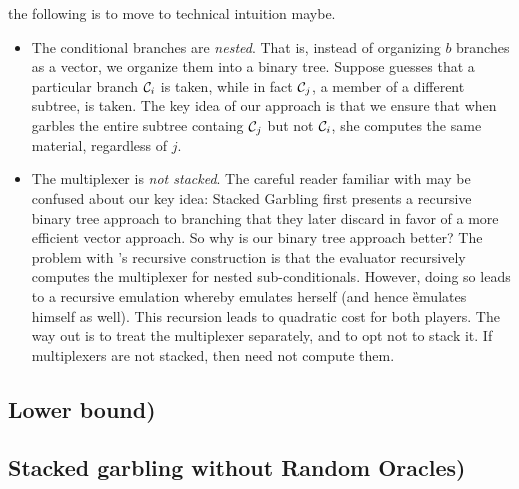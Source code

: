 the following is to move to technical intuition maybe.
\begin{itemize}
	
	\item The conditional branches are \emph{nested}.
	That is, instead of organizing $b$ branches as a vector, we
	organize them into a binary tree.
	Suppose \E guesses that a particular branch $\mathcal C_i$ is taken,
	while in fact $\mathcal C_j$, a member of a different subtree, is taken.
	The key idea of our approach is that we ensure that when \ev
	garbles the entire subtree containg $\mathcal C_j$ but not $\mathcal C_i$, she
	computes the same material, regardless of $j$.
	\item The multiplexer is \emph{not stacked}.
	The careful reader familiar with \cite{EPRINT:HeaKol20b} may be
	confused about our key idea: Stacked Garbling first presents a
	recursive binary tree approach to branching that they later
	discard in favor of a more efficient vector approach.
	So why is our binary tree approach better?
	The problem with \cite{EPRINT:HeaKol20b}'s recursive construction
	is that the evaluator recursively computes the multiplexer for
	nested sub-conditionals.
	However, doing so leads to a recursive emulation whereby \E
	emulates herself (and hence \G emulates himself as well).
	This recursion leads to quadratic cost for both players.
	The way out is to treat the multiplexer separately, and to opt not
	to stack it.
	If multiplexers are not stacked, then \E need not compute them.
\end{itemize}







\subsection{Lower bound)}
\label{sec:techOverviewLB}






\subsection{Stacked garbling without Random Oracles)}
\label{sec:techOverviewRO}




